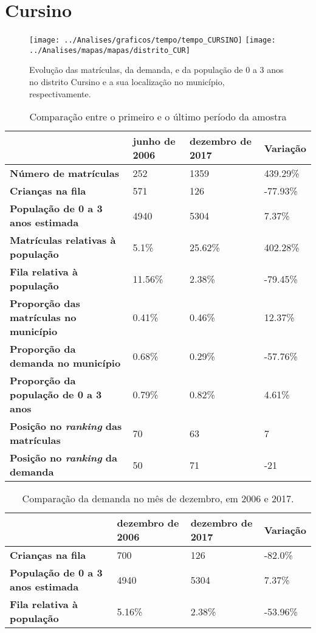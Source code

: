 \section{Cursino}
\begin{figure}[H]
	\centering
	\texttt{[image: ../Analises/graficos/tempo/tempo\_CURSINO]}
	\texttt{[image: ../Analises/mapas/mapas/distrito\_CUR]}
	\caption{Evolução das matrículas, da demanda, e da população de 0 a 3 anos no distrito Cursino e a sua localização no município, respectivamente.}
\end{figure}
\begin{table}[H]
	\begin{tabular}{|l|l|l|l|}
		\hline
		\textbf{}                                      & \textbf{junho de 2006}       & \textbf{dezembro de 2017}    & \textbf{Variação} \\ \hline
		\textbf{Número de matrículas}                  & 252 & 1359 & 439.29\% \\ \hline
		\textbf{Crianças na fila}                      & 571 & 126 & -77.93\% \\ \hline
		\textbf{População de 0 a 3 anos estimada}      & 4940 & 5304 & 7.37\% \\ \hline
		\textbf{Matrículas relativas à população}      & 5.1\% & 25.62\% & 402.28\% \\ \hline
		\textbf{Fila relativa à população}             & 11.56\% & 2.38\% & -79.45\% \\ \hline
		\textbf{Proporção das matrículas no município} & 0.41\% & 0.46\% & 12.37\% \\ \hline
		\textbf{Proporção da demanda no município}     & 0.68\% & 0.29\% & -57.76\% \\ \hline
		\textbf{Proporção da população de 0 a 3 anos}  & 0.79\% & 0.82\% & 4.61\% \\ \hline
		\textbf{Posição no \textit{ranking} das matrículas}     & 70 & 63 & 7 \\ \hline
		\textbf{Posição no \textit{ranking} da demanda}         & 50 & 71 & -21 \\ \hline
	\end{tabular}
	\caption{Comparação entre o primeiro e o último período da amostra}
\end{table}
\begin{table}[H]
	\begin{tabular}{|l|l|l|l|}
		\hline
		\textbf{}                                 & \textbf{dezembro de 2006} & \textbf{dezembro de 2017} & \textbf{Variação} \\ \hline
		\textbf{Crianças na fila}                      & 700 & 126 & -82.0\% \\ \hline
		\textbf{População de 0 a 3 anos estimada}      & 4940 & 5304 & 7.37\% \\ \hline
		\textbf{Fila relativa à população}             & 5.16\% & 2.38\% & -53.96\% \\ \hline
	\end{tabular}
	\caption{Comparação da demanda no mês de dezembro, em 2006 e 2017.}
\end{table}
